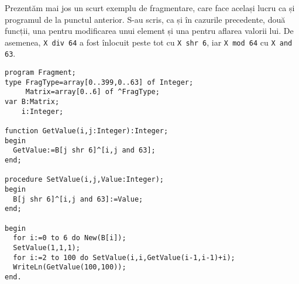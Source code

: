Prezentăm mai jos un scurt exemplu de fragmentare, care face același lucru ca
și programul de la punctul anterior. S-au scris, ca și în cazurile precedente,
două funcții, una pentru modificarea unui element și una pentru aflarea
valorii lui. De asemenea, {\tt X div 64} a fost înlocuit peste tot cu {\tt X
  shr 6}, iar {\tt X mod 64} cu {\tt X and 63}.

\begin{verbatim}
program Fragment;
type FragType=array[0..399,0..63] of Integer;
     Matrix=array[0..6] of ^FragType;
var B:Matrix;
    i:Integer;

function GetValue(i,j:Integer):Integer;
begin
  GetValue:=B[j shr 6]^[i,j and 63];
end;

procedure SetValue(i,j,Value:Integer);
begin
  B[j shr 6]^[i,j and 63]:=Value;
end;

begin
  for i:=0 to 6 do New(B[i]);
  SetValue(1,1,1);
  for i:=2 to 100 do SetValue(i,i,GetValue(i-1,i-1)+i);
  WriteLn(GetValue(100,100));
end.
\end{verbatim}
